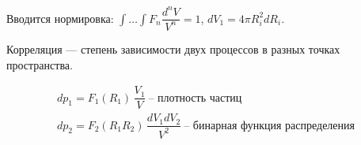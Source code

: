 \begin{lecture}
\begin{lecSection}
		Вводится нормировка: $ \int \dots \int F_n \dfrac{d^n V}{V^n} = 1 $, $ dV_1 = 4\pi R_i^2 dR_i $.
		
		Корреляция --- степень зависимости двух процессов в разных точках пространства.
		
		\begin{gather*}
			d p_1 = F_1 (R_1) \,\dfrac{V_1}{V} ~ \text{-- плотность частиц} \\
			d p_2 = F_2 (R_1 R_2) \,\dfrac{dV_1 dV_2}{V^2} ~ \text{-- бинарная функция распределения}
		\end{gather*}
	\end{lecSection}
\end{lecture}
